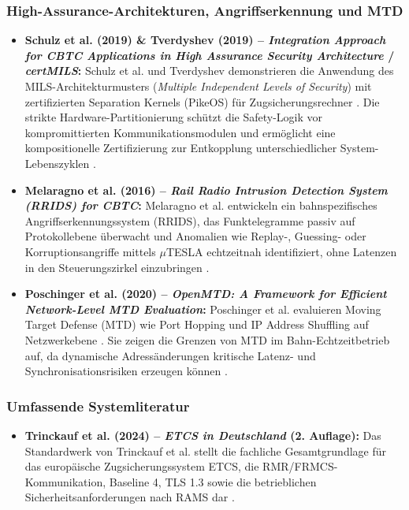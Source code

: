 \documentclass[runningheads]{res/llncs}
\begin{document}
\subsubsection{High-Assurance-Architekturen, Angriffserkennung und MTD}
\begin{itemize}
    \item \textbf{Schulz et al. (2019) \& Tverdyshev (2019) -- \textit{Integration Approach for CBTC Applications in High Assurance Security Architecture} / \textit{certMILS}:}
    Schulz et al. und Tverdyshev demonstrieren die Anwendung des MILS-Architekturmusters (\textit{Multiple Independent Levels of Security}) mit zertifizierten Separation Kernels (PikeOS) für Zugsicherungsrechner \parencite[S. 31--35]{schulzIntegration2019}\parencite[S. 80--83]{tverdyshevCertMILS2019}. Die strikte Hardware-Partitionierung schützt die Safety-Logik vor kompromittierten Kommunikationsmodulen und ermöglicht eine kompositionelle Zertifizierung zur Entkopplung unterschiedlicher System-Lebenszyklen \parencite[S. 32--34]{schulzIntegration2019}.

    \item \textbf{Melaragno et al. (2016) -- \textit{Rail Radio Intrusion Detection System (RRIDS) for CBTC}:}
    Melaragno et al. entwickeln ein bahnspezifisches Angriffserkennungssystem (RRIDS), das Funktelegramme passiv auf Protokollebene überwacht und Anomalien wie Replay-, Guessing- oder Korruptionsangriffe mittels $\mu$TESLA echtzeitnah identifiziert, ohne Latenzen in den Steuerungszirkel einzubringen \parencite[S. 39--48]{melaragnoRail2016}.

    \item \textbf{Poschinger et al. (2020) -- \textit{OpenMTD: A Framework for Efficient Network-Level MTD Evaluation}:}
    Poschinger et al. evaluieren Moving Target Defense (MTD) wie Port Hopping und IP Address Shuffling auf Netzwerkebene \parencite[S. 66--68, 121]{poschingerOpenMTD2020}. Sie zeigen die Grenzen von MTD im Bahn-Echtzeitbetrieb auf, da dynamische Adressänderungen kritische Latenz- und Synchronisationsrisiken erzeugen können \parencite[S. 121]{poschingerOpenMTD2020}.
\end{itemize}

\subsubsection{Umfassende Systemliteratur}
\begin{itemize}
    \item \textbf{Trinckauf et al. (2024) -- \textit{ETCS in Deutschland} (2. Auflage):}
    Das Standardwerk von Trinckauf et al. stellt die fachliche Gesamtgrundlage für das europäische Zugsicherungssystem ETCS, die RMR/FRMCS-Kommunikation, Baseline 4, TLS 1.3 sowie die betrieblichen Sicherheitsanforderungen nach RAMS dar \parencite[S. 49, 123, 204--211]{trinckaufETCS2024}.
\end{itemize}
\end{document}
